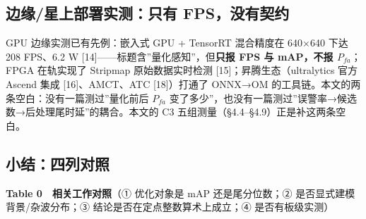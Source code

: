 \subsection{边缘/星上部署实测：只有
FPS，没有契约}\label{ux8fb9ux7f18ux661fux4e0aux90e8ux7f72ux5b9eux6d4bux53eaux6709-fpsux6ca1ux6709ux5951ux7ea6}

GPU 边缘实测已有先例：嵌入式 GPU + TensorRT 混合精度在 640×640 下达 208
FPS、6.2 W {[}14{]}------标题含''量化感知''，但\textbf{只报 FPS 与
mAP，不报 \(P_{fa}\)}；FPGA 在轨实现了 Stripmap 原始数据实时检测
{[}15{]}；昇腾生态（ultralytics 官方 Ascend 集成 {[}16{]}、AMCT、ATC
{[}18{]}）打通了 ONNX→OM
的工具链。本文的两条空白：没有一篇测过''量化前后 \(P_{fa}\)
变了多少''，也没有一篇测过''误警率→候选数→后处理尾时延''的耦合。本文的
C3 五组测量（§4.4--§4.9）正是补这两条空白。

\subsection{小结：四列对照}\label{ux5c0fux7ed3ux56dbux5217ux5bf9ux7167}

\textbf{Table 0　相关工作对照}（① 优化对象是 mAP 还是尾分位数；②
是否显式建模背景/杂波分布；③ 结论是否在定点整数算术上成立；④
是否有板级实测）

